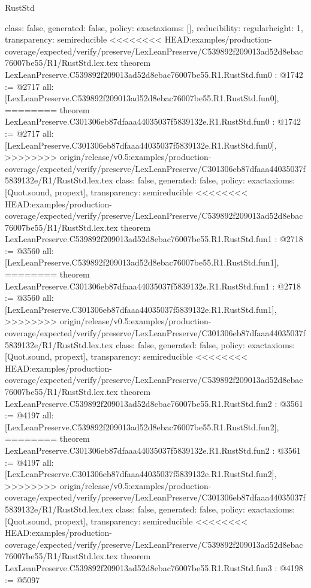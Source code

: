 \begin{lexlean}{RustStd}
\begin{coremodule}
{\begin{coremodule}
{{{  class: false,
  generated: false,
  policy: exact{axioms: []},
  reducibility: regular{height: 1},
  transparency: semireducible
}
<<<<<<<< HEAD:examples/production-coverage/expected/verify/preserve/LexLeanPreserve/C539892f209013ad52d8ebac76007be55/R1/RustStd.lex.tex
theorem LexLeanPreserve.C539892f209013ad52d8ebac76007be55.R1.RustStd.fun0 : @1742 := @2717 {
  all: [LexLeanPreserve.C539892f209013ad52d8ebac76007be55.R1.RustStd.fun0],
========
theorem LexLeanPreserve.C301306eb87dfaaa44035037f5839132e.R1.RustStd.fun0 : @1742 := @2717 {
  all: [LexLeanPreserve.C301306eb87dfaaa44035037f5839132e.R1.RustStd.fun0],
>>>>>>>> origin/release/v0.5:examples/production-coverage/expected/verify/preserve/LexLeanPreserve/C301306eb87dfaaa44035037f5839132e/R1/RustStd.lex.tex
  class: false,
  generated: false,
  policy: exact{axioms: [Quot.sound, propext]},
  transparency: semireducible
}
<<<<<<<< HEAD:examples/production-coverage/expected/verify/preserve/LexLeanPreserve/C539892f209013ad52d8ebac76007be55/R1/RustStd.lex.tex
theorem LexLeanPreserve.C539892f209013ad52d8ebac76007be55.R1.RustStd.fun1 : @2718 := @3560 {
  all: [LexLeanPreserve.C539892f209013ad52d8ebac76007be55.R1.RustStd.fun1],
========
theorem LexLeanPreserve.C301306eb87dfaaa44035037f5839132e.R1.RustStd.fun1 : @2718 := @3560 {
  all: [LexLeanPreserve.C301306eb87dfaaa44035037f5839132e.R1.RustStd.fun1],
>>>>>>>> origin/release/v0.5:examples/production-coverage/expected/verify/preserve/LexLeanPreserve/C301306eb87dfaaa44035037f5839132e/R1/RustStd.lex.tex
  class: false,
  generated: false,
  policy: exact{axioms: [Quot.sound, propext]},
  transparency: semireducible
}
<<<<<<<< HEAD:examples/production-coverage/expected/verify/preserve/LexLeanPreserve/C539892f209013ad52d8ebac76007be55/R1/RustStd.lex.tex
theorem LexLeanPreserve.C539892f209013ad52d8ebac76007be55.R1.RustStd.fun2 : @3561 := @4197 {
  all: [LexLeanPreserve.C539892f209013ad52d8ebac76007be55.R1.RustStd.fun2],
========
theorem LexLeanPreserve.C301306eb87dfaaa44035037f5839132e.R1.RustStd.fun2 : @3561 := @4197 {
  all: [LexLeanPreserve.C301306eb87dfaaa44035037f5839132e.R1.RustStd.fun2],
>>>>>>>> origin/release/v0.5:examples/production-coverage/expected/verify/preserve/LexLeanPreserve/C301306eb87dfaaa44035037f5839132e/R1/RustStd.lex.tex
  class: false,
  generated: false,
  policy: exact{axioms: [Quot.sound, propext]},
  transparency: semireducible
}
<<<<<<<< HEAD:examples/production-coverage/expected/verify/preserve/LexLeanPreserve/C539892f209013ad52d8ebac76007be55/R1/RustStd.lex.tex
theorem LexLeanPreserve.C539892f209013ad52d8ebac76007be55.R1.RustStd.fun3 : @4198 := @5097 {
}}}}}}
\end{coremodule}}
\end{coremodule}
\end{lexlean}
